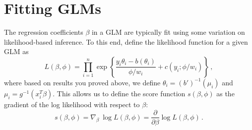 \documentclass[11pt]{article}
\begin{document}
\section{Fitting GLMs}

 The regression coefficients $\beta$ in a GLM are typically fit using some variation on likelihood-based inference.  To this end, define the likelihood function for a given GLM as
$$
L(\beta, \phi) = \prod_{i=1}^n \exp \left\{ \frac{y_i \theta_i - b(\theta_i)}{\phi/w_i} + c(y_i; \phi/w_i)   \right \} \, ,
$$
where based on results you proved above, we define $\theta_i = (b')^{-1}(\mu_i)$ and $\mu_i = g^{-1}(x_i^T \beta)$.  This allows us to define the score function $s(\beta, \phi)$ as the gradient of the log likelihood with respect to $\beta$:
$$
s(\beta, \phi) = \nabla_\beta \  \log L(\beta, \phi) = \frac{\partial}{\partial \beta} \log L(\beta, \phi) \, .
$$
\end{document}
